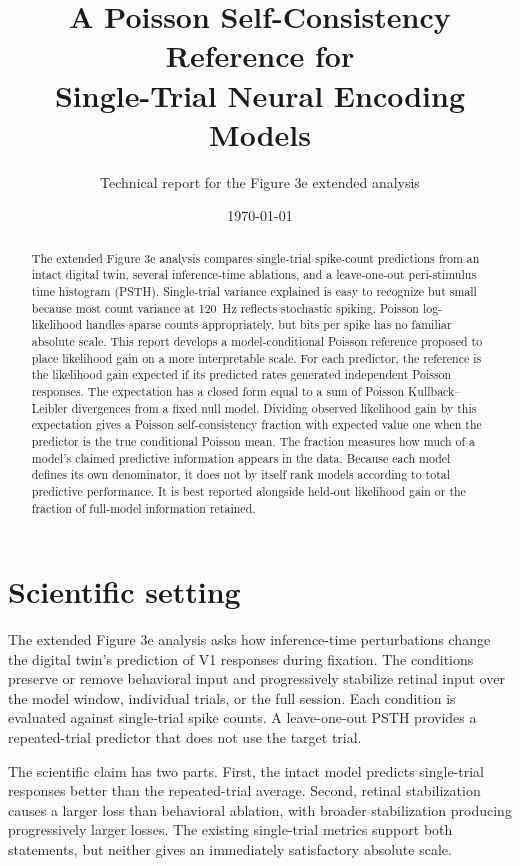 \documentclass[11pt]{article}
\title{A Poisson Self-Consistency Reference for\\Single-Trial Neural Encoding Models}
\author{Technical report for the Figure 3e extended analysis}
\date{\today}
\begin{document}
\maketitle

\begin{abstract}
The extended Figure 3e analysis compares single-trial spike-count predictions from an intact digital twin, several inference-time ablations, and a leave-one-out peri-stimulus time histogram (PSTH). Single-trial variance explained is easy to recognize but small because most count variance at 120~Hz reflects stochastic spiking. Poisson log-likelihood handles sparse counts appropriately, but bits per spike has no familiar absolute scale. This report develops a model-conditional Poisson reference proposed to place likelihood gain on a more interpretable scale. For each predictor, the reference is the likelihood gain expected if its predicted rates generated independent Poisson responses. The expectation has a closed form equal to a sum of Poisson Kullback--Leibler divergences from a fixed null model. Dividing observed likelihood gain by this expectation gives a Poisson self-consistency fraction with expected value one when the predictor is the true conditional Poisson mean. The fraction measures how much of a model's claimed predictive information appears in the data. Because each model defines its own denominator, it does not by itself rank models according to total predictive performance. It is best reported alongside held-out likelihood gain or the fraction of full-model information retained.
\end{abstract}

\section{Scientific setting}

The extended Figure 3e analysis asks how inference-time perturbations change the digital twin's prediction of V1 responses during fixation. The conditions preserve or remove behavioral input and progressively stabilize retinal input over the model window, individual trials, or the full session. Each condition is evaluated against single-trial spike counts. A leave-one-out PSTH provides a repeated-trial predictor that does not use the target trial.

The scientific claim has two parts. First, the intact model predicts single-trial responses better than the repeated-trial average. Second, retinal stabilization causes a larger loss than behavioral ablation, with broader stabilization producing progressively larger losses. The existing single-trial metrics support both statements, but neither gives an immediately satisfactory absolute scale.
\end{document}
